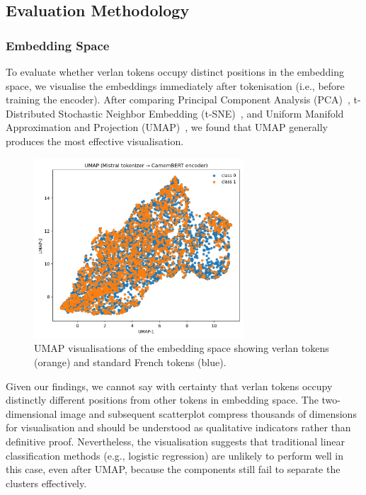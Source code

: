 \documentclass[12pt]{article}
\begin{document}
\subsection{Evaluation Methodology}

\subsubsection{Embedding Space}
To evaluate whether verlan tokens occupy distinct positions in the embedding space, 
we visualise the embeddings immediately after tokenisation (i.e., before training the encoder). 
After comparing Principal Component Analysis (PCA)~\cite{pearson1901pca}, 
t-Distributed Stochastic Neighbor Embedding (t-SNE)~\cite{maaten2008tsne}, 
and Uniform Manifold Approximation and Projection (UMAP)~\cite{mcinnes2018umap}, 
we found that UMAP generally produces the most effective visualisation.

\begin{figure}[htbp]
    \centering
    \includegraphics[width=0.7\textwidth]{figures/mistral_bert_umap.png}
    \caption{UMAP visualisations of the embedding space showing verlan tokens (orange) and standard French tokens (blue).}
    \label{fig:umap_comparison}
\end{figure}

Given our findings, we cannot say with certainty that verlan tokens occupy distinctly different positions from other tokens in embedding space.
The two-dimensional image and subsequent scatterplot compress thousands of dimensions for visualisation and should be understood as qualitative indicators rather than definitive proof.
Nevertheless, the visualisation suggests that traditional linear classification methods (e.g., logistic regression) are unlikely to perform well in this case, even after UMAP, because the components still fail to separate the clusters effectively.
\end{document}
